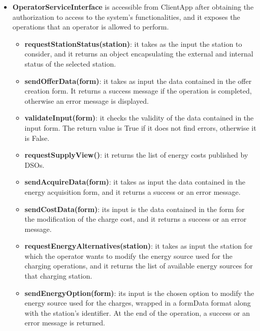 \documentclass[../main.tex]{subfiles}
\begin{document}
\begin{itemize}
    \item \textbf{OperatorServiceInterface} is accessible from ClientApp after obtaining the authorization to access to the system's functionalities, and it exposes the operations that an operator is allowed to perform. 
    \begin{itemize}
        \item \textbf{requestStationStatus(station)}: it takes as the input the station to consider, and it returns an object encapsulating the external and internal status of the selected station.
        \item \textbf{sendOfferData(form)}: it takes as input the data contained in the offer creation form. It returns a success message if the operation is completed, otherwise an error message is displayed.
        \item \textbf{validateInput(form)}: it checks the validity of the data contained in the input form. The return value is True if it does not find errors, otherwise it is False.
        \item \textbf{requestSupplyView()}: it returns the list of energy costs published by DSOs. 
        \item \textbf{sendAcquireData(form)}: it takes as input the data contained in the energy acquisition form, and it returns a success or an error message.
        \item \textbf{sendCostData(form)}: its input is the data contained in the form for the modification of the charge cost, and it returns a success or an error message.
        \item \textbf{requestEnergyAlternatives(station)}: it takes as input the station for which the operator wants to modify the energy source used for the charging operations, and it returns the list of available energy sources for that charging station. 
        \item \textbf{sendEnergyOption(form)}: its input is the chosen option to modify the energy source used for the charges, wrapped in a formData format along with the station's identifier. At the end of the operation, a success or an error message is returned.
    \end{itemize}


\end{itemize}
\end{document}
